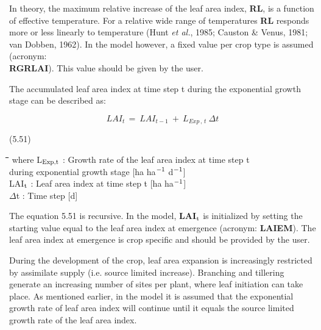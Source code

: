 In theory, the maximum relative increase of the leaf area index, {\bf RL}, is a function of
effective temperature. For a relative wide range of temperatures {\bf RL} responds more or
less linearly to tempera\-ture (Hunt {\it et al.\/}, 1985; Causton \& Venus, 1981; van Dobben,
1962). In the model however, a fixed value per crop type is assumed (acronym: \\
{\bf R\-GRLAI}). This value should be given by the user.




 The accumulated leaf area index at time step t during the exponential growth stage can be
described as:

\begin{displaymath}
LAI _{t~} =~LAI _{t-1} ~+~L _{Exp\, ,\, t} ~\Delta t
\end{displaymath}

 
\strut\hfill (5.51)
\nwln
\begin{tabbing}
\hspace{1.27cm}\=\hspace{1.27cm}\=\hspace{1.27cm}\=\hspace{1.27cm}\=%
\hspace{1.27cm}\=\hspace{1.27cm}\=\hspace{1.27cm}\=\hspace{1.27cm}\=%
\hspace{1.27cm}\=\hspace{1.27cm}\=\kill
where L$_{{\rm Exp,t}}$ : Growth rate of the leaf area index at time step t\\
   during exponential growth stage        [ha ha$^{{\rm -1}}$ d$^{{\rm -1}}$]\\
LAI$_{{\rm t}}$ : Leaf area index at time step t         [ha ha$^{{\rm -1}}$]\\
$\Delta$t : Time step        [d]
\end{tabbing}


The equation 5.51 is recursive. In the model, {\bf LAI$_{{\rm t}}$} is initialized by setting the starting
value equal to the leaf area index at emergence (acronym: {\bf LAIEM}). The leaf area index
at emergence is crop specific and should be provided by the user.



During the development of the crop, leaf area expansion is increasingly restricted by
assimilate supply (i.e. source limited increase). Branching and tillering generate an
increasing number of sites per plant, where leaf initiation can take place. As mentioned
earlier, in the model it is assumed that the exponential growth rate of leaf area index will
continue until it equals the source limited growth rate of the leaf area index.



